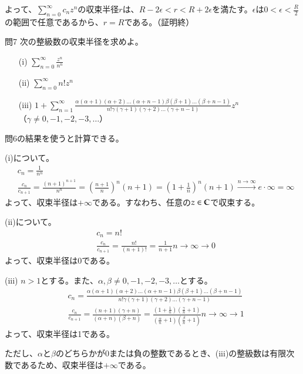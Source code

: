 よって、$\sum_{n=0}^\infty c_nz^n$の収束半径$r$は、$R-2\epsilon<r<R+2\epsilon$を満たす。$\epsilon$は$0<\epsilon<\frac{R}{2}$の範囲で任意であるから、$r=R$である。（証明終）

\begin{mysimplebox}{問7}
    次の整級数の収束半径を求めよ。
    \begin{itemize}
        \item[(i)]{$\displaystyle\sum_{n=0}^{\infty}\frac{z^n}{n^n}$}
        \item[(ii)]{$\displaystyle\sum_{n=0}^{\infty}n!z^n$}
        \item[(iii)]{$\displaystyle 1+\sum_{n=1}^{\infty}\frac{\alpha(\alpha+1)(\alpha+2)\dots(\alpha+n-1)\beta(\beta+1)\dots(\beta+n-1)}{n!\gamma(\gamma+1)(\gamma+2)\dots(\gamma+n-1)}z^n$\\（$\gamma\neq 0, -1,-2,-3,\dots$）} 
    \end{itemize}
\end{mysimplebox}
問6の結果を使うと計算できる。

(i)について。
\begin{align*}
    &c_n=\frac{1}{n^n}\\
    &\frac{c_n}{c_{n+1}}=\frac{(n+1)^{n+1}}{n^n}=\left(\frac{n+1}{n}\right)^n(n+1)=\left(1+\frac{1}{n}\right)^n(n+1)\overset{n\longrightarrow\infty}{\longrightarrow}e\cdot \infty=\infty
\end{align*}
よって、収束半径は$+\infty$である。すなわち、任意の$z\in\mathbb{C}$で収束する。

(ii)について。
\begin{align*}
    &c_n=n!\\
    &\frac{c_n}{c_{n+1}}=\frac{n!}{(n+1)!}=\frac{1}{n+1}{n\longrightarrow\infty}{\longrightarrow}0
\end{align*}
よって、収束半径は0である。

(iii)
$n>1$とする。また、$\alpha, \beta\neq 0, -1,-2,-3,\dots$とする。
\begin{align*}
    &c_n=\frac{\alpha(\alpha+1)(\alpha+2)\dots(\alpha+n-1)\beta(\beta+1)\dots(\beta+n-1)}{n!\gamma(\gamma+1)(\gamma+2)\dots(\gamma+n-1)}\\
    &\frac{c_n}{c_{n+1}}=\frac{(n+1)(\gamma+n)}{(\alpha+n)(\beta+n)}=\frac{(1+\frac{1}{n})(\frac{\gamma}{n}+1)}{(\frac{\alpha}{n}+1)(\frac{\beta}{n}+1)}{n\longrightarrow\infty}{\longrightarrow}1
\end{align*}
よって、収束半径は1である。

ただし、$\alpha$と$\beta$のどちらかが0または負の整数であるとき、(iii)の整級数は有限次数であるため、収束半径は$+\infty$である。

